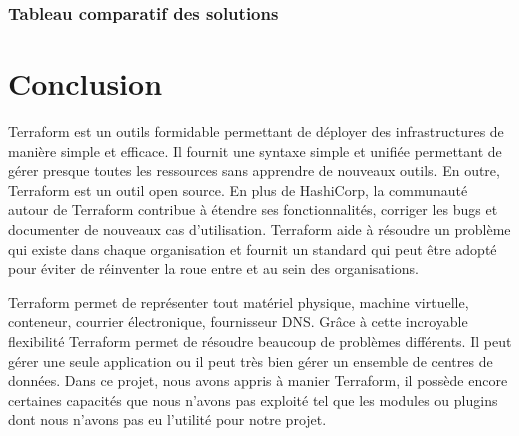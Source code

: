 \documentclass[]{article}
\begin{document}
\subsubsection{Tableau comparatif des solutions}
\newpage
\section{Conclusion}\label{conclusion}

Terraform est un outils formidable permettant de déployer des
infrastructures de manière simple et efficace. Il fournit une syntaxe
simple et unifiée permettant de gérer presque toutes les ressources sans
apprendre de nouveaux outils. En outre, Terraform est un outil open
source. En plus de HashiCorp, la communauté autour de Terraform
contribue à étendre ses fonctionnalités, corriger les bugs et documenter
de nouveaux cas d'utilisation. Terraform aide à résoudre un problème qui
existe dans chaque organisation et fournit un standard qui peut être
adopté pour éviter de réinventer la roue entre et au sein des
organisations.

Terraform permet de représenter tout matériel physique, machine virtuelle, conteneur, courrier électronique, fournisseur DNS. Grâce à cette incroyable flexibilité Terraform permet de résoudre beaucoup de problèmes différents. Il peut gérer une seule application ou il peut très bien gérer un ensemble de centres de données. Dans ce projet, nous avons appris à manier Terraform, il possède encore certaines capacités que nous n'avons pas exploité tel que les modules ou plugins dont nous n'avons pas eu l'utilité pour notre projet.
\end{document}
